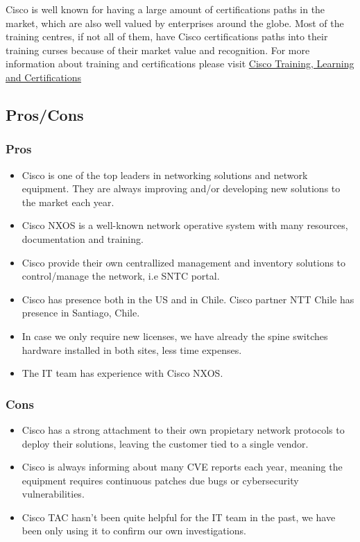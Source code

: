   Cisco is well known for having a large amount of certifications paths in the market, which are also well valued by enterprises around the globe. Most of the training centres, if not all of them, have Cisco certifications paths into their training curses because of their market value and recognition. For more information about training and certifications please visit \href{https://www.cisco.com/c/en/us/training-events/training-certifications.html}{Cisco Training, Learning and Certifications} 

\newpage

  \subsection{Pros/Cons}

  \subsubsection{Pros}
  \begin{itemize}
    \item Cisco is one of the top leaders in networking solutions and network equipment. They are always improving and/or developing new solutions to the market each year.
	\item Cisco NXOS is a well-known network operative system with many resources, documentation and training. 
	\item Cisco provide their own centrallized management and inventory solutions to control/manage the network, i.e SNTC portal. 
    \item Cisco has presence both in the US and in Chile. Cisco partner NTT Chile has presence in Santiago, Chile.
    \item In case we only require new licenses, we have already the spine switches hardware installed in both sites, less time expenses. 
    \item The IT team has experience with Cisco NXOS.
  \end{itemize}

  \subsubsection{Cons}
  \begin{itemize}
    \item Cisco has a strong attachment to their own propietary network protocols to deploy their solutions, leaving the customer tied to a single vendor.
    \item Cisco is always informing about many CVE reports each year, meaning the equipment requires continuous patches due bugs or cybersecurity vulnerabilities.
    \item Cisco TAC hasn't been quite helpful for the IT team in the past, we have been only using it to confirm our own investigations.
  \end{itemize}

